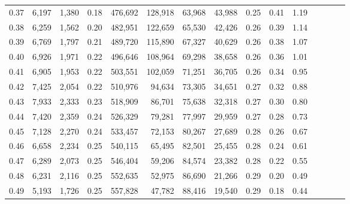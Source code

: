 \begin{tabular}{rrrcrrrrrrrrrrr}
0.37 &   6,197 &  1,380 &                                       0.18 &  476,692 &  128,918 &   63,968 &   43,988 &  0.25 &  0.41 &                         1.19 \\
0.38 &   6,259 &  1,562 &                                       0.20 &  482,951 &  122,659 &   65,530 &   42,426 &  0.26 &  0.39 &                         1.14 \\
0.39 &   6,769 &  1,797 &                                       0.21 &  489,720 &  115,890 &   67,327 &   40,629 &  0.26 &  0.38 &                         1.07 \\
0.40 &   6,926 &  1,971 &                                       0.22 &  496,646 &  108,964 &   69,298 &   38,658 &  0.26 &  0.36 &                         1.01 \\
0.41 &   6,905 &  1,953 &                                       0.22 &  503,551 &  102,059 &   71,251 &   36,705 &  0.26 &  0.34 &                         0.95 \\
0.42 &   7,425 &  2,054 &                                       0.22 &  510,976 &   94,634 &   73,305 &   34,651 &  0.27 &  0.32 &                         0.88 \\
0.43 &   7,933 &  2,333 &                                       0.23 &  518,909 &   86,701 &   75,638 &   32,318 &  0.27 &  0.30 &                         0.80 \\
0.44 &   7,420 &  2,359 &                                       0.24 &  526,329 &   79,281 &   77,997 &   29,959 &  0.27 &  0.28 &                         0.73 \\
0.45 &   7,128 &  2,270 &                                       0.24 &  533,457 &   72,153 &   80,267 &   27,689 &  0.28 &  0.26 &                         0.67 \\
0.46 &   6,658 &  2,234 &                                       0.25 &  540,115 &   65,495 &   82,501 &   25,455 &  0.28 &  0.24 &                         0.61 \\
0.47 &   6,289 &  2,073 &                                       0.25 &  546,404 &   59,206 &   84,574 &   23,382 &  0.28 &  0.22 &                         0.55 \\
0.48 &   6,231 &  2,116 &                                       0.25 &  552,635 &   52,975 &   86,690 &   21,266 &  0.29 &  0.20 &                         0.49 \\
0.49 &   5,193 &  1,726 &                                       0.25 &  557,828 &   47,782 &   88,416 &   19,540 &  0.29 &  0.18 &                         0.44 \\

\end{tabular}
